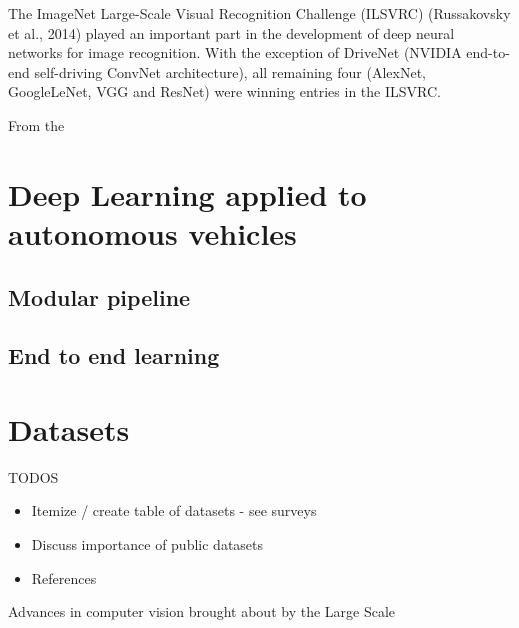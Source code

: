 The  ImageNet Large-Scale Visual Recognition Challenge (ILSVRC) (Russakovsky et al., 2014) played an important part in the development of deep neural networks for image recognition. With the exception of DriveNet (NVIDIA end-to-end self-driving ConvNet architecture), all remaining four (AlexNet, GoogleLeNet, VGG and ResNet) were winning entries in the ILSVRC.  

From the 

\section{Deep Learning applied to autonomous vehicles}

\subsection{Modular pipeline}

\subsection{End to end learning}



\lipsum[1]

\section{Datasets}

TODOS

\begin{itemize}
    \item Itemize / create table of datasets - see surveys
    \item Discuss importance of public datasets
    \item References
\end{itemize}

Advances in computer vision brought about by the Large Scale 

\lipsum[2]
